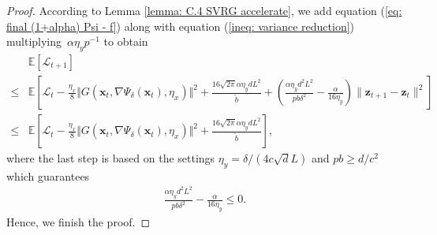 \documentclass[11pt]{article}
\def\vx{\mathbf{x}}
\def\vz{\mathbf{z}}
\begin{document}
\begin{proof}
According to Lemma \ref{lemma: C.4 SVRG accelerate}, we add equation (\ref{eq: final (1+alpha) Psi - f}) along with equation (\ref{ineq: variance reduction}) multiplying~$\alpha\eta_y p^{-1}$ to obtain
\begin{align*}
&\mathbb{E}\left[\mathcal{L}_{t+1}\right]\\
 \leq&  \mathbb{E}\left[ \mathcal{L}_t - \frac{\eta_x}{8} \Vert G(\vx_t,\nabla\Psi_\delta(\vx_t),\eta_x)  \Vert^2   
+\frac{ 16\sqrt{2\pi}\alpha \eta_y dL^2}{\tilde{b}} + \left(\frac{\alpha \eta_y d^2L^2}{pb\delta^2}-\frac{\alpha}{16\eta_y}\right) \| \vz_{t+1}-\vz_t\|^2  \right] \\
\leq&   \mathbb{E}\left[ \mathcal{L}_t - \frac{\eta_x}{8} \Vert G(\vx_t,\nabla\Psi_\delta(\vx_t),\eta_x)  \Vert^2 
+\frac{  16\sqrt{2\pi}\alpha \eta_y dL^2}{\tilde{b}}\right],
\end{align*}
where the last step is based on the settings $\eta_y={\delta}/{(4c\sqrt{d}L)}$ and $pb \ge d/c^2$ which guarantees 
\begin{align*}
\frac{\alpha \eta_y d^2L^2}{pb\delta^2}-\frac{\alpha}{16\eta_y} \leq 0.    
\end{align*}
Hence, we finish the proof.
\end{proof}
\end{document}
